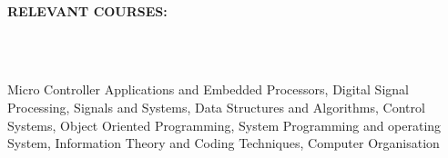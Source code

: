 \documentclass[a4paper,12pt]{report}
\begin{document}
\begin{adjustwidth}{-0.59in}{-0.52in}
\\
\textbf{RELEVANT COURSES:} 
\end{adjustwidth}
 \\
\begin{adjustwidth}{-0.59in}{0.0in}
\\
Micro Controller Applications and Embedded Processors, Digital Signal Processing, Signals and Systems, Data Structures and Algorithms, Control Systems, Object Oriented Programming, System Programming and operating System, Information Theory and Coding Techniques, Computer Organisation
\end{adjustwidth}
 \\
\vspace{12pt}
\end{document}
